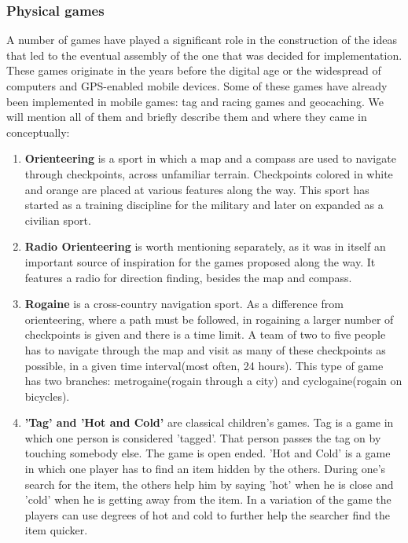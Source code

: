 \subsubsection{Physical games}

A number of games have played a significant role in the construction of the
ideas that led to the eventual assembly of the one that was decided for
implementation. These games originate in the years before the digital age or the
widespread of computers and GPS-enabled mobile devices. Some of these games have
already been implemented in mobile games: tag and racing games and geocaching.
We will mention all of them and briefly describe them and where they came in
conceptually:
\begin{enumerate}
  \item \textbf{Orienteering} is a sport in which a map and a compass are used
  to navigate through checkpoints, across unfamiliar terrain. Checkpoints
  colored in white and orange are placed at various features along the way. This
  sport has started as a training discipline for the military and later on
  expanded as a civilian sport.
  
  \item \textbf{Radio Orienteering} is worth mentioning separately, as it was in
  itself an important source of inspiration for the games proposed along the
  way. It features a radio for direction finding, besides the map and compass. 
  
  \item \textbf{Rogaine} is a cross-country navigation sport. As a difference
  from orienteering, where a path must be followed, in rogaining a larger number
  of checkpoints is given and there is a time limit. A team of two to five
  people has to navigate through the map and visit as many of these checkpoints
  as possible, in a given time interval(most often, 24 hours). This type of game
  has two branches: metrogaine(rogain through a city) and cyclogaine(rogain on
  bicycles).
  
  \item \textbf{'Tag' and 'Hot and Cold'} are classical children's games. Tag is
  a game in which one person is considered 'tagged'. That person passes the tag
  on by touching somebody else. The game is open ended. 'Hot and Cold' is a game
  in which one player has to find an item hidden by the others. During one's
  search for the item, the others help him by saying 'hot' when he is close and
  'cold' when he is getting away from the item. In a variation of the game the
  players can use degrees of hot and cold to further help the searcher find the
  item quicker.
    
\end{enumerate}

